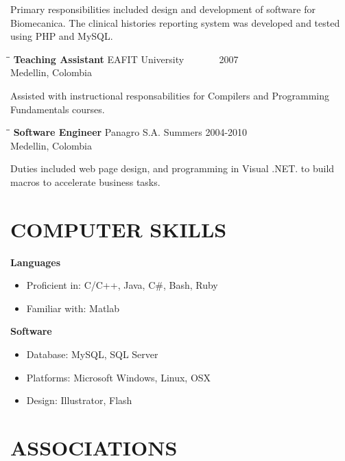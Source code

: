 \documentclass{res}
\begin{document}
\begin{resume}
	Primary responsibilities included design and development of software for Biomecanica.
	The clinical histories reporting system was developed and tested  using PHP and MySQL.

   \begin{tabbing}
   \hspace{2.3in}\= \hspace{2.6in}\= \kill %
    {\bf Teaching Assistant} \>EAFIT University\> ~~~~~~ 2007\\
                          \>Medellin, Colombia
   \end{tabbing}\vspace{-15pt}
    Assisted with instructional responsabilities for Compilers and Programming Fundamentals courses.
   \begin{tabbing}%
   \hspace{2.3in}\= \hspace{2.6in}\= \kill %
   {\bf Software Engineer}\> Panagro S.A.\> Summers  2004-2010\\
                          \>Medellin, Colombia
   \end{tabbing}\vspace{-15pt}
    Duties included web page design, and programming in Visual .NET. to build macros to accelerate business tasks.

\section{COMPUTER SKILLS}
	\vspace{0.05 in}	

    \textbf{Languages}\\
	\vspace{-0.1 in}	
    \begin{itemize}
    	\item Proficient in: C/C++, Java, C\#, Bash, Ruby
    	\item Familiar with: Matlab
    \end{itemize}

	\textbf{Software}
	\begin{itemize}
		\item Database: MySQL, SQL Server
		\item Platforms: Microsoft Windows, Linux, OSX
		\item Design: Illustrator, Flash
	\end{itemize} 

\section{ASSOCIATIONS}


\end{resume}
\end{document}
